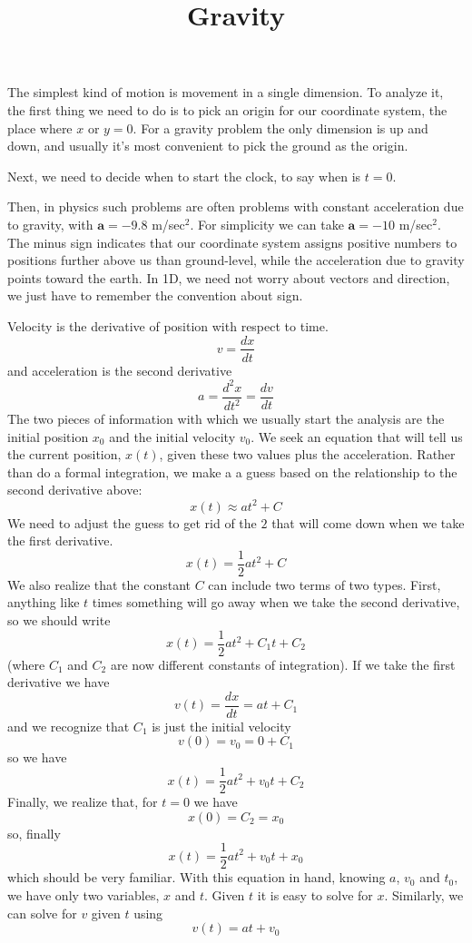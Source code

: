 \documentclass[11pt, oneside]{article}   	%
\title{Gravity}
\date{}							%
\begin{document}
\maketitle
\Large
\noindent
The simplest kind of motion is movement in a single dimension.  To analyze it, the first thing we need to do is to pick an origin for our coordinate system, the place where $x$ or $y=0$.  For a gravity problem the only dimension is up and down, and usually it's most convenient to pick the ground as the origin.  

Next, we need to decide when to start the clock, to say when is $t=0$.

Then, in physics such problems are often problems with constant acceleration due to gravity, with $\mathbf{a}=-9.8$ m/sec$^2$.  For simplicity we can take $\mathbf{a}=-10$ m/sec$^2$.  The minus sign indicates that our coordinate system assigns positive numbers to positions further above us than ground-level, while the acceleration due to gravity points toward the earth.  In 1D, we need not worry about vectors and direction, we just have to remember the convention about sign.

Velocity is the derivative of position with respect to time.
\[ v = \frac{dx}{dt} \]
and acceleration is the second derivative
\[ a = \frac{d^2x}{dt^2} = \frac{dv}{dt} \]
The two pieces of information with which we usually start the analysis are the initial position $x_0$ and the initial velocity $v_0$.  We seek an equation that will tell us the current position, $x(t)$, given these two values plus the acceleration.  Rather than do a formal integration, we make a a guess based on the relationship to the second derivative above:
\[ x(t) \approx at^2 + C \]
We need to adjust the guess to get rid of the $2$ that will come down when we take the first derivative.
\[ x(t) = \frac{1}{2}at^2 + C \]
We also realize that the constant $C$ can include two terms of two types.  First, anything like $t$ times something will go away when we take the second derivative, so we should write
\[ x(t) = \frac{1}{2}at^2 + C_1t + C_2 \]
(where $C_1$ and $C_2$ are now different constants of integration).  If we take the first derivative we have
\[ v(t) = \frac{dx}{dt} = at + C_1 \]
and we recognize that $C_1$ is just the initial velocity
\[ v(0) = v_0 = 0 + C_1 \]
so we have
\[ x(t) = \frac{1}{2}at^2 + v_0t + C_2 \]
Finally, we realize that, for $t=0$ we have
\[ x(0) = C_2 = x_0 \]
so, finally
\[ x(t) = \frac{1}{2}at^2 + v_0t + x_0 \]
which should be very familiar.  With this equation in hand, knowing $a$, $v_0$ and $t_0$, we have only two variables, $x$ and $t$.  Given $t$ it is easy to solve for $x$.  Similarly, we can solve for $v$ given $t$ using
\[ v(t) = at + v_0 \]
\end{document}

